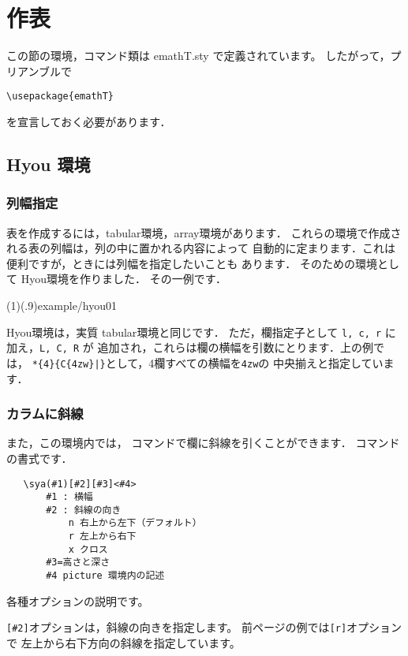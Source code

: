 \section{作表}
この節の環境，コマンド類は \textsf{emathT.sty} で定義されています。
したがって，プリアンブルで
\begin{jquote}
  \verb/\usepackage{emathT}/
\end{jquote}
を宣言しておく必要があります．

\subsection{\textsf{Hyou} 環境}
\subsubsection{列幅指定}
表を作成するには，\textsf{tabular}環境，\textsf{array}環境があります．
これらの環境で作成される表の列幅は，列の中に置かれる内容によって
自動的に定まります．これは便利ですが，ときには列幅を指定したいことも
あります．
そのための環境として \textsf{Hyou}環境を作りました．
その一例です．

\showexample[列幅一定の表](1)(.9){example/hyou01}

\textsf{Hyou}環境は，実質 \textsf{tabular}環境と同じです．
ただ，欄指定子として \texttt{l, c, r} に加え，\texttt{L, C, R} が
追加され，これらは欄の横幅を引数にとります．上の例では，
\verb/*{4}{C{4zw}|}/として，4欄すべての横幅を\texttt{4zw}の
中央揃えと指定しています．

\subsubsection{カラムに斜線}
また，この環境内では， コマンドで欄に斜線を引くことができます．
コマンドの書式です．

\begin{boxnote}
\begin{verbatim}
   \sya(#1)[#2][#3]<#4>
       #1 : 横幅
       #2 : 斜線の向き
           n 右上から左下（デフォルト）
           r 左上から右下
           x クロス
       #3=高さと深さ
       #4 picture 環境内の記述
\end{verbatim}
\end{boxnote}

各種オプションの説明です。

\verb/[#2]/オプションは，斜線の向きを指定します。
前ページの例では\verb/[r]/オプションで
左上から右下方向の斜線を指定しています。

